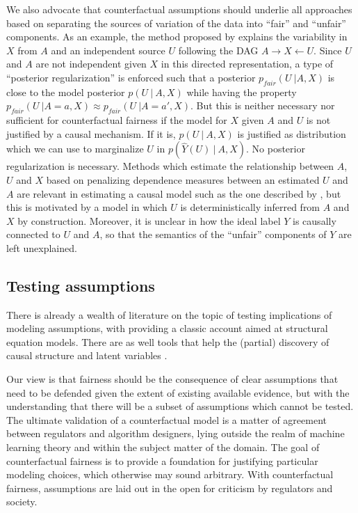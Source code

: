 We also advocate that counterfactual assumptions should underlie all approaches based on separating the sources of variation of the data into ``fair'' and ``unfair'' components. As an example, the method proposed by \cite{louizos2015variational} explains the variability in $X$ from $A$ and an independent source $U$ following the DAG $A \rightarrow X \leftarrow U$. Since $U$ and $A$ are not independent given $X$ in this directed representation, a type of ``posterior regularization'' \citep{ganchev:10} is enforced such that a posterior $p_{fair}(U\ | A, X)$ is close to the model posterior $p(U\ |\ A, X)$ while having the property $p_{fair}(U\ | A = a, X) \approx p_{fair}(U\ | A = a', X)$. But this is neither necessary nor sufficient for counterfactual fairness if the model for $X$ given $A$ and $U$ is not justified by a causal mechanism. If it is, $p(U\ |\ A, X)$ is justified as distribution which we can use to marginalize $U$ in $p(\hat Y(U)\ |\ A, X)$. No posterior regularization is necessary.  Methods which estimate the relationship between $A$, $U$ and $X$ based on penalizing dependence measures between an estimated $U$ and $A$ are relevant in estimating a causal model such as the one described by \citep{mooij:09}, but this is motivated by a model in which $U$ is deterministically inferred from $A$ and $X$ by construction. Moreover, it is unclear in \cite{louizos2015variational} how the ideal label $Y$ is causally connected to $U$ and $A$, so that the semantics of the ``unfair''
components of $Y$ are left unexplained.

\subsection{Testing assumptions}

There is already a wealth of literature on the topic of testing implications of modeling assumptions, with \citep{bollen:93} providing a classic account aimed at structural equation models. There are as well tools that help the (partial) discovery of causal structure \citep{sgs:00,peters:14} and latent variables \citep{silva:10b,HalpernSontag_uai13,anima:14}.

Our view is that fairness should be the consequence of clear assumptions that need to be defended given the extent of existing available evidence, but with the understanding that there will be a subset of assumptions which cannot be tested. The ultimate validation of a counterfactual model is a matter of agreement between regulators and algorithm designers, lying outside the realm of machine learning theory and within the subject matter of the domain. The goal of counterfactual fairness is to provide a foundation for justifying particular modeling choices, which otherwise may sound arbitrary. With counterfactual fairness, assumptions are laid out in the open for criticism by regulators and society.

